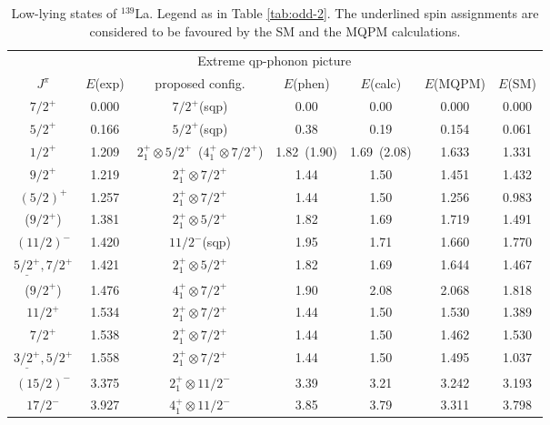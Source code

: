 \begin{table}[htbp]
\begin{center}
\caption{Low-lying states of $^{139}$La. Legend as in Table \ref{tab:odd-2}.
The underlined spin assignments are considered to be favoured by the SM
and the MQPM calculations.}
\begin{tabular}{cc|cccc|c}
\hline
& & \multicolumn{3}{c}{Extreme qp-phonon picture} & & \\
$J^{\pi}$ & $E$(exp) & proposed config. & $E$(phen) & $E$(calc) 
& $E$(MQPM) & $E$(SM) \\ 
\hline
$7/2^{+}$ & 0.000 & $7/2^+$(sqp) & 0.00 & 0.00 & 0.000 & 0.000 \\
$5/2^{+}$ & 0.166 & $5/2^+$(sqp) & 0.38 & 0.19 & 0.154 & 0.061 \\
$1/2^{+}$ & 1.209 & $2^+_1\otimes 5/2^+$\ ($4^+_1\otimes 7/2^+$) 
& 1.82\ (1.90) & 1.69\ (2.08) & 1.633 & 1.331 \\
$9/2^{+}$ & 1.219 & $2^+_1\otimes 7/2^+$ & 1.44 & 1.50 & 1.451 & 1.432 \\
$(5/2)^{+}$ & 1.257 & $2^+_1\otimes 7/2^+$ & 1.44 & 1.50 & 1.256 & 0.983 \\
($9/2^{+}$) & 1.381 & $2^+_1\otimes 5/2^+$ & 1.82 & 1.69 & 1.719 & 1.491 \\
$(11/2)^{-}$ & 1.420 & $11/2^-$(sqp) & 1.95 & 1.71 & 1.660 & 1.770 \\
$\underline{5/2^{+}},7/2^{+}$ & 1.421 & $2^+_1\otimes 5/2^+$ & 1.82 & 
1.69 & 1.644 & 1.467 \\
($9/2^{+}$) & 1.476 & $4^+_1\otimes 7/2^+$ & 1.90 & 2.08 & 2.068 & 1.818 \\
$11/2^{+}$ & 1.534 & $2^+_1\otimes 7/2^+$ & 1.44 & 1.50 & 1.530 & 1.389 \\
$7/2^{+}$ & 1.538 & $2^+_1\otimes 7/2^+$ & 1.44 & 1.50 & 1.462 & 1.530 \\
$\underline{3/2^{+}},5/2^{+}$ & 1.558 & $2^+_1\otimes 7/2^+$ & 1.44 & 
1.50 & 1.495 & 1.037 \\
$(15/2)^{-}$ & 3.375 & $2^+_1\otimes 11/2^-$ & 3.39 & 3.21 & 3.242 & 3.193 \\
$17/2^{-}$ & 3.927 & $4^+_1\otimes 11/2^-$ & 3.85 & 3.79 & 3.311 & 3.798 \\
\hline
\end{tabular}
\label{tab:odd-4}
\end{center}
\end{table}
